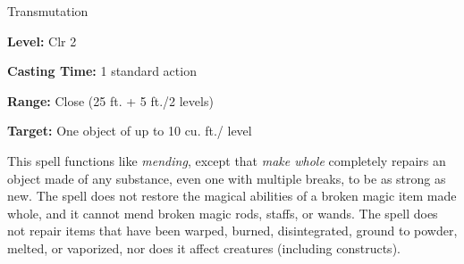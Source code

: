 
Transmutation

\textbf{Level:} Clr 2

\textbf{Casting Time:} 1 standard action

\textbf{Range:} Close (25 ft. + 5 ft./2 levels)

\textbf{Target:} One object of up to 10 cu. ft./ level

This spell functions like \textit{mending}, except that \textit{make whole} completely 
repairs an object made of any substance, even one with multiple breaks, to be as 
strong as new. The spell does not restore the magical abilities of a broken magic 
item made whole, and it cannot mend broken magic rods, staffs, or wands. The spell 
does not repair items that have been warped, burned, disintegrated, ground to powder, 
melted, or vaporized, nor does it affect creatures (including constructs).

